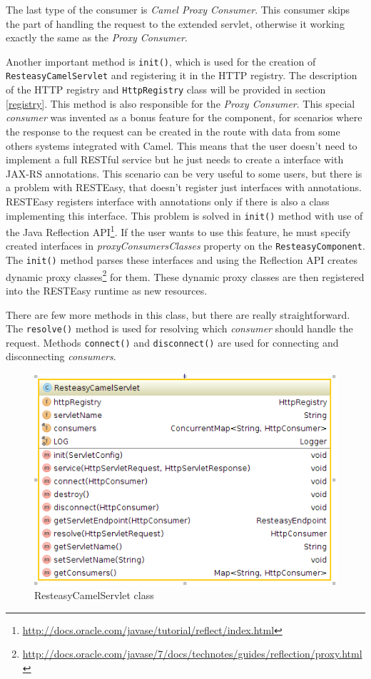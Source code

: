 \documentclass[12pt,final,oneside]{fithesis2}
\begin{document}
The last type of the consumer is \textit{Camel Proxy Consumer}. This consumer skips the part of handling the request to the extended servlet, otherwise it working exactly the same as the \textit{Proxy Consumer}.     

Another important method is \texttt{init()}, which is used for the creation of \texttt{ResteasyCamelServlet} and registering it in the HTTP registry. The description of the HTTP registry and \texttt{HttpRegistry} class will be provided in section \ref{registry}. This method is also responsible for the \textit{Proxy Consumer}. This special \textit{consumer} was invented as a bonus feature for the component, for scenarios where the response to the request can be created in the route with data from some others systems integrated with Camel. This means that the user doesn't need to implement a full RESTful service but he just needs to create a interface with JAX-RS annotations. This scenario can be very useful to some users, but there is a problem with RESTEasy, that  doesn't register just interfaces with annotations. RESTEasy registers interface with annotations only if there is also a class implementing this interface. This problem is solved in \texttt{init()} method with use of the Java Reflection API\footnote{\url{http://docs.oracle.com/javase/tutorial/reflect/index.html}}. If the user wants to use this feature, he must specify created interfaces in \textit{proxyConsumersClasses} property on the \texttt{ResteasyComponent}. The \texttt{init()} method parses these interfaces and using the Reflection API creates dynamic proxy classes\footnote{\url{http://docs.oracle.com/javase/7/docs/technotes/guides/reflection/proxy.html}} for them. These dynamic proxy classes are then registered into the RESTEasy runtime as new resources.

There are few more methods in this class, but there are really straightforward. The \texttt{resolve()} method is used for resolving which \textit{consumer} should handle the request. Methods \texttt{connect()} and \texttt{disconnect()} are used for connecting and disconnecting \textit{consumers}. 

\begin{figure}
\centering
\includegraphics[width=0.8\linewidth]{images/servlet.png}
\caption{ResteasyCamelServlet class}
\label{comp}
\end{figure}
\end{document}
